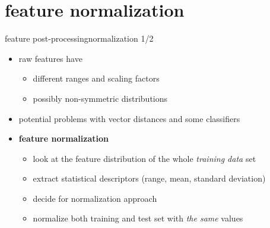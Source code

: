    \section[normalization]{feature normalization}
		\begin{frame}{feature post-processing}{normalization 1/2}
            \begin{itemize}
                \item   raw features have
                    \begin{itemize}
                        \item	different ranges and scaling factors
                        \item	possibly non-symmetric distributions
                    \end{itemize}
                \smallskip
                \item[$\Rightarrow$]<2->    potential problems with vector distances and some classifiers
                \bigskip
                \item[$\Rightarrow$]<3->    \textbf{feature normalization}
                    \begin{itemize}
                        \item   look at the feature distribution of the whole \textit{training data} set
                        \item   extract statistical descriptors (range, mean, standard deviation)
                        \item   decide for normalization approach
                        \item   normalize both training and test set with \textit{the same} values
                    \end{itemize}
            \end{itemize}
			
		\end{frame}

